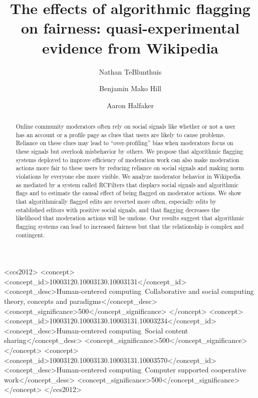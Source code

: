 \documentclass[format=acmsmall, natbib=true,  screen=true]{acmart}
\begin{document}
\newcommand{\mywidth}{.6\columnwidth}



\title[The effects of algorithmic flagging on fairness]{The effects of algorithmic flagging on fairness: quasi-experimental evidence from Wikipedia}

\author{Nathan TeBlunthuis}

\author{Benjamin Mako Hill}

\author{Aaron Halfaker}

\renewcommand{\shortauthors}{TeBlunthuis et al.}


\begin{abstract}

Online community moderators often rely on social signals like whether or not a user has an account or a profile page as clues that users are likely to cause problems. Reliance on these clues may lead to ``over-profiling'' bias when moderators focus on these signals but overlook misbehavior by others. We propose that algorithmic flagging systems deployed to improve efficiency of moderation work can also make moderation actions more fair to these users by reducing reliance on social signals and making norm violations by everyone else more visible. We analyze moderator behavior in Wikipedia as mediated by a system called RCFilters that displays social signals and algorithmic flags and to estimate the causal effect of being flagged on moderator actions.  We show that algorithmically flagged edits are reverted more often, especially edits by established editors with positive social signals, and that flagging decreases the likelihood that moderation actions will be undone. Our results suggest that algorithmic flagging systems can lead to increased fairness but that the relationship is complex and contingent.
\end{abstract}

\begin{CCSXML}
<ccs2012>
<concept>
<concept_id>10003120.10003130.10003131</concept_id>
<concept_desc>Human-centered computing~Collaborative and social computing theory, concepts and paradigms</concept_desc>
<concept_significance>500</concept_significance>
</concept>
<concept>
<concept_id>10003120.10003130.10003131.10003234</concept_id>
<concept_desc>Human-centered computing~Social content sharing</concept_desc>
<concept_significance>500</concept_significance>
</concept>
<concept>
<concept_id>10003120.10003130.10003131.10003570</concept_id>
<concept_desc>Human-centered computing~Computer supported cooperative work</concept_desc>
<concept_significance>500</concept_significance>
</concept>
</ccs2012>
\end{CCSXML}
\end{document}
